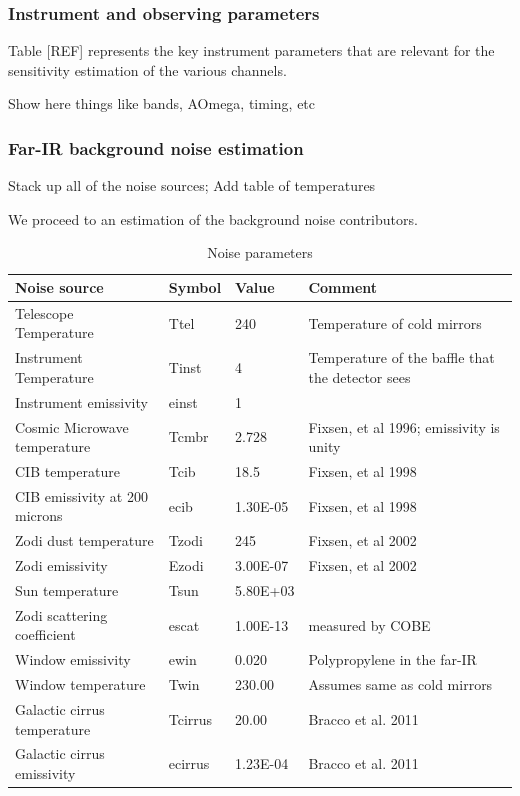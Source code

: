 \subsubsection{Instrument and observing parameters}

Table [REF] represents the key instrument parameters that are relevant for the sensitivity estimation of the various channels. 




Show here things like bands, AOmega, timing, etc
\subsubsection{Far-IR background noise estimation}
Stack up all of the noise sources; Add table of temperatures

We proceed to an estimation of the background noise contributors. 

\renewcommand{\arraystretch}{1.5}
\def\labelitemi{--}
\begin{table}[htbp]
\small
\begin{longtable}{p{5cm}p{1.5cm}p{2.5cm}p{3.5cm}}
\toprule
Noise source  & Symbol &  Value & Comment \\
\midrule

Telescope Temperature	&	Ttel	&	240	&	Temperature of cold mirrors	\\
Instrument Temperature	&	Tinst	&	4	&	Temperature of the baffle that the detector sees	\\
Instrument emissivity	&	einst	&	1	&		\\
Cosmic Microwave temperature	&	Tcmbr	&	2.728	&	Fixsen, et al 1996; emissivity is unity	\\
CIB temperature	&	Tcib	&	18.5	&	Fixsen, et al 1998	\\
CIB emissivity at 200 microns	&	ecib	&	1.30E-05	&	Fixsen, et al 1998	\\
Zodi dust temperature	&	Tzodi	&	245	&	Fixsen, et al 2002	\\
Zodi emissivity	&	Ezodi	&	3.00E-07	&	Fixsen, et al 2002	\\
Sun temperature	&	Tsun	&	5.80E+03	&		\\
Zodi scattering coefficient	&	escat	&	1.00E-13	&	measured by COBE	\\
Window emissivity	&	ewin	&	0.020	&	Polypropylene in the far-IR	\\
Window temperature	&	Twin	&	230.00	&	Assumes same as cold mirrors	\\
Galactic cirrus temperature	&	Tcirrus	&	20.00	&	Bracco et al. 2011	\\
Galactic cirrus emissivity	&	ecirrus	&	1.23E-04	&	Bracco et al. 2011	\\

\bottomrule
\end{longtable}
\caption[Noise parameters]{Noise parameters}
\label{tab:noiseparams}
\end{table}


